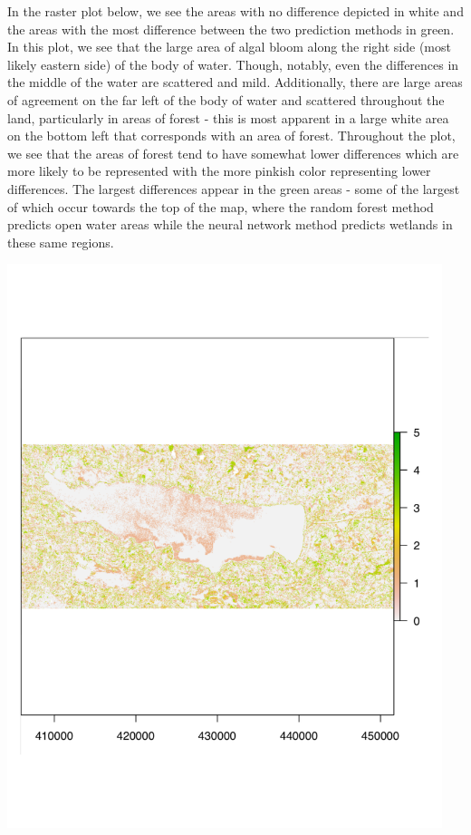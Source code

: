 \documentclass[11pt]{article}
\begin{document}
In the raster plot below, we see the areas with no difference depicted in white and the areas with the most difference between the two prediction methods in green. In this plot, we see that the large area of algal bloom along the right side (most likely eastern side) of the body of water. Though, notably, even the differences in the middle of the water are scattered and mild. Additionally, there are large areas of agreement on the far left of the body of water and scattered throughout the land, particularly in areas of forest - this is most apparent in a large white area on the bottom left that corresponds with an area of forest. Throughout the plot, we see that the areas of forest tend to have somewhat lower differences which are more likely to be represented with the more pinkish color representing lower differences. The largest differences appear in the green areas - some of the largest of which occur towards the top of the map, where the random forest method predicts open water areas while the neural network method predicts wetlands in these same regions.

\begin{center}
\includegraphics[width=5in]{differenceplot.pdf}
\end{center}
\end{document}
